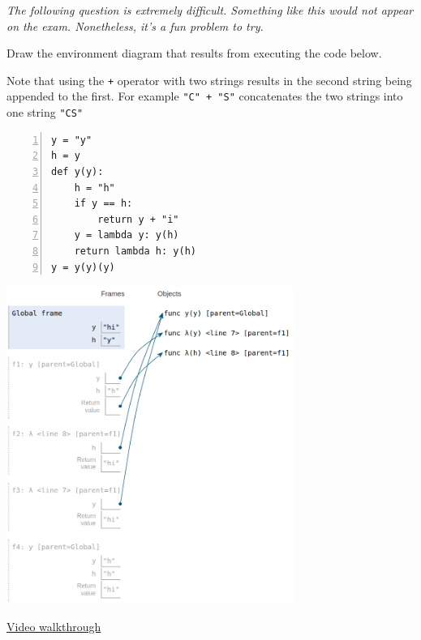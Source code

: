 \question \textit{The following question is extremely difficult. Something
like this would not appear on the exam. Nonetheless, it's a fun problem to
try.}

Draw the environment diagram that results from executing the code below.

Note that using the \texttt{+} operator with two strings results in the
second string being appended to the first. For example \texttt{"C" + "S"}
concatenates the two strings into one string \texttt{"CS"}
\begin{lstlisting}[numbers=left, numberfirstline=false]
y = "y"
h = y
def y(y):
    h = "h"
    if y == h:
        return y + "i"
    y = lambda y: y(h)
    return lambda h: y(h)
y = y(y)(y)
\end{lstlisting}

\begin{solution}[2in]
\begin{center}
\includegraphics[width=0.7\textwidth]{y.png}
\end{center}
\href{https://www.youtube.com/watch?v=MlRfJaGBeAY&feature=youtu.be}{Video walkthrough}
\end{solution}
